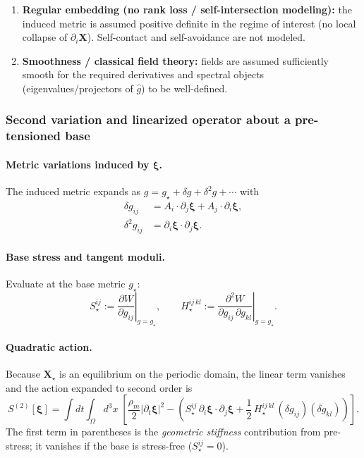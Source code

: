 \begin{enumerate}
  \item \textbf{Regular embedding (no rank loss / self-intersection modeling):}
  the induced metric is assumed positive definite in the regime of interest
  (no local collapse of $\partial_i\mathbf X$). Self-contact and self-avoidance are not modeled.

  \item \textbf{Smoothness / classical field theory:}
  fields are assumed sufficiently smooth for the required derivatives and
  spectral objects (eigenvalues/projectors of $\widehat g$) to be well-defined.
\end{enumerate}

\subsubsection{Second variation and linearized operator about a pre-tensioned base}
\label{sec:second-variation-linearization}

\paragraph{Metric variations induced by $\boldsymbol\xi$.}
The induced metric expands as $g=g_\star+\delta g + \delta^2 g + \cdots$ with
\begin{align}
  \delta g_{ij}
  &=
  A_i\cdot\partial_j\boldsymbol\xi
  +
  A_j\cdot\partial_i\boldsymbol\xi,
  \label{eq:delta-metric}
  \\
  \delta^2 g_{ij}
  &=
  \partial_i\boldsymbol\xi\cdot\partial_j\boldsymbol\xi.
  \label{eq:delta2-metric}
\end{align}

\paragraph{Base stress and tangent moduli.}
Evaluate at the base metric $g_\star$:
\begin{equation}
  S_\star^{ij}:=\left.\frac{\partial W}{\partial g_{ij}}\right|_{g=g_\star},
  \qquad
  H_\star^{ij\,kl}:=\left.\frac{\partial^2 W}{\partial g_{ij}\,\partial g_{kl}}\right|_{g=g_\star}.
  \label{eq:base-stress-and-moduli}
\end{equation}

\paragraph{Quadratic action.}
Because $\mathbf X_\star$ is an equilibrium on the periodic domain, the linear term vanishes and
the action expanded to second order is
\begin{equation}
  S^{(2)}[\boldsymbol\xi]
  =
  \int dt\int_{\Omega} d^3x\;
  \left[
    \frac{\rho_m}{2}|\partial_t\boldsymbol\xi|^2
    -
    \left(
      S_\star^{ij}\,\partial_i\boldsymbol\xi\cdot\partial_j\boldsymbol\xi
      +
      \frac12\,H_\star^{ij\,kl}\,(\delta g_{ij})(\delta g_{kl})
    \right)
  \right].
  \label{eq:quadratic-action}
\end{equation}
The first term in parentheses is the \emph{geometric stiffness} contribution from pre-stress;
it vanishes if the base is stress-free ($S_\star^{ij}=0$).

